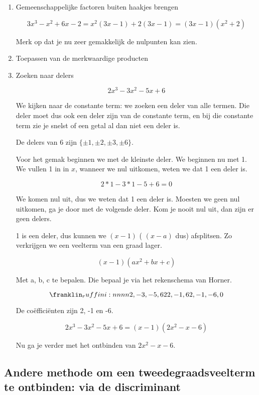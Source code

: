 \begin{enumerate}
	\item Gemeenschappelijke factoren buiten haakjes brengen
	
	\[ 3 x^3 - x^2 + 6x - 2 = x^2(3x - 1) + 2(3x - 1) = (3x-1)(x^2 + 2) \]
	
	Merk op dat je nu zeer gemakkelijk de nulpunten kan zien.
	
	\item Toepassen van de merkwaardige producten
	
	\item Zoeken naar delers
	
	\[ 2x^3 - 3x^2 - 5x + 6 \]
	
	We kijken naar de constante term: we zoeken een deler van alle termen. Die deler moet dus ook een deler zijn van de constante term, en bij die constante term zie je snelst of een getal al dan niet een deler is.
	
	De delers van 6 zijn \( \lbrace \pm 1, \pm 2, \pm 3, \pm 6 \rbrace  \).
	
	Voor het gemak beginnen we met de kleinste deler. We beginnen nu met 1. We vullen 1 in in \(x\), wanneer we nul uitkomen, weten we dat 1 een deler is.
	
	\[ 2 * 1 - 3 * 1 - 5 + 6 = 0 \]
	
	We komen nul uit, dus we weten dat 1 een deler is. Moesten we geen nul uitkomen, ga je door met de volgende deler. Kom je nooit nul uit, dan zijn er geen delers.
	
	1 is een deler, dus kunnen we \( (x - 1) \) ( \((x-a)\) dus) afsplitsen. Zo verkrijgen we een veelterm van een graad lager.
	
	\[ (x-1)(a x^2 + bx + c) \]
	
	Met a, b, c te bepalen. Die bepaal je via het rekenschema van Horner.
	
	\[ \horner{2,-3,-5,6}{2}{2,-1,6}{2,-1,-6,0} \]
	
	De coëfficiënten zijn 2, -1 en -6.
	
	\[ 2x^3 - 3x^2 - 5x + 6 = (x-1)(2x^2 - x - 6)  \]
	
	Nu ga je verder met het ontbinden van \(2x^2 - x - 6\).
	
\end{enumerate}

\subsection{Andere methode om een tweedegraadsveelterm te ontbinden: via de discriminant}

